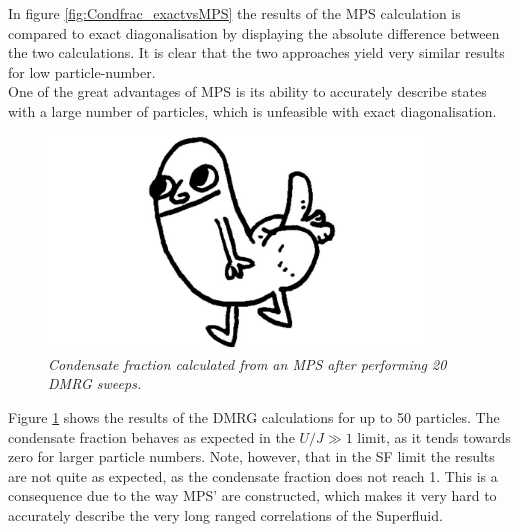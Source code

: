 In figure \ref{fig:Condfrac_exactvsMPS} the results of the MPS calculation is compared to exact diagonalisation by displaying the absolute difference between the two calculations. It is clear that the two approaches yield very similar results for low particle-number.\\
One of the great advantages of MPS is its ability to accurately describe states with a large number of particles, which is unfeasible with exact diagonalisation. 
\begin{figure}[h!]
	\centering
	\includegraphics[width=0.9\textwidth]{Figures/placeholder.jpg}
	\caption{\textit{Condensate fraction calculated from an MPS after performing 20 DMRG sweeps.}}
	\label{fig:Condfrac_4to50}
\end{figure}
Figure \ref{fig:Condfrac_4to50} shows the results of the DMRG calculations for up to 50 particles. The condensate fraction behaves as expected in the $U/J \gg 1$ limit, as it tends towards zero for larger particle numbers. Note, however, that in the SF limit the results are not quite as expected, as the condensate fraction does not reach 1. This is a consequence due to the way MPS' are constructed, which makes it very hard to accurately describe the very long ranged correlations of the Superfluid.


